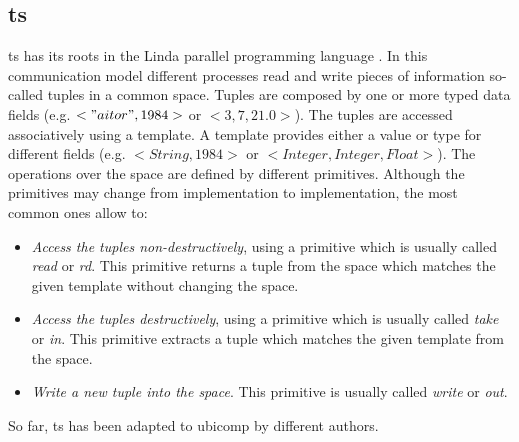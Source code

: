 \subsection{\acl{ts}}
\label{sec:tuplespaces_eoa}


\acf{ts} has its roots in the Linda parallel programming language \citep{gelernter_generative_1985}.
In this communication model different processes read and write pieces of information so-called tuples in a common space.
Tuples are composed by one or more typed data fields (e.g. $<"aitor",1984>$ or $<3,7,21.0>$).
The tuples are accessed associatively using a template.
A template provides either a value or type for different fields (e.g. $<String,1984>$ or $<Integer, Integer, Float>$).
The operations over the space are defined by different primitives.
Although the primitives may change from implementation to implementation, the most common ones allow to:

\begin{itemize}
  \item \emph{Access the tuples non-destructively}, using a primitive which is usually called \emph{read} or \emph{rd}.
	This primitive returns a tuple from the space which matches the given template without changing the space.
  \item \emph{Access the tuples destructively}, using a primitive which is usually called \emph{take} or \emph{in}.
	This primitive extracts a tuple which matches the given template from the space.
  \item \emph{Write a new tuple into the space}. This primitive is usually called \emph{write} or \emph{out}.
\end{itemize}



\bigskip

So far, \acl{ts} has been adapted to \acl{ubicomp} by different authors.

